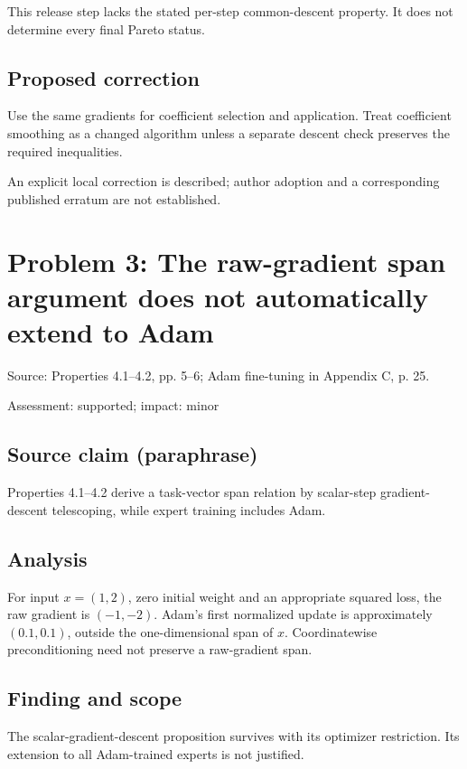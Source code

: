 \documentclass[11pt]{article}
\begin{document}
This release step lacks the stated per-step common-descent property. It does not determine every final Pareto status.

\subsection*{Proposed correction}

Use the same gradients for coefficient selection and application. Treat coefficient smoothing as a changed algorithm unless a separate descent check preserves the required inequalities.

An explicit local correction is described; author adoption and a corresponding published erratum are not established.

\section*{Problem 3: The raw-gradient span argument does not automatically extend to Adam}

Source: Properties 4.1–4.2, pp. 5–6; Adam fine-tuning in Appendix C, p. 25.

Assessment: supported; impact: minor

\subsection*{Source claim (paraphrase)}

Properties 4.1–4.2 derive a task-vector span relation by scalar-step gradient-descent telescoping, while expert training includes Adam.

\subsection*{Analysis}

For input \(x=(1,2)\), zero initial weight and an appropriate squared loss, the raw gradient is \((-1,-2)\). Adam’s first normalized update is approximately \((0.1,0.1)\), outside the one-dimensional span of \(x\). Coordinatewise preconditioning need not preserve a raw-gradient span.

\subsection*{Finding and scope}

The scalar-gradient-descent proposition survives with its optimizer restriction. Its extension to all Adam-trained experts is not justified.
\end{document}
